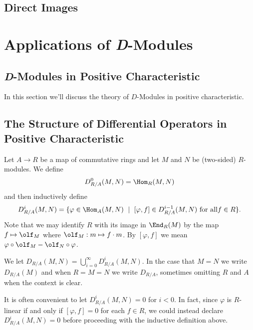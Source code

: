 
\subsection{Direct Images}

\section{Applications of \textit{D}-Modules}


\subsection{\emph{D}-Modules in Positive Characteristic}
In this section we'll discuss the theory of $D$-Modules in positive characteristic. 
\subsection{The Structure of Differential Operators in Positive Characteristic}

\begin{defn}\label{defn:diff-op-rings}
	Let $A\to R$ be a map of commutative rings and let $M$ and $N$ be (two-sided) $R$-modules. We define
	\begin{align*}
		D^0_{R/A}(M,N) = \Hom_R(M,N)
	\end{align*}
	and then inductively define
	\begin{align*}
		D^i_{R/A}(M,N) = \{\varphi \in \Hom_A(M,N) ~\mid~ [\varphi,f] \in D^{i-1}_{R/A}(M,N) ~ \text{for all} f \in R\}.
	\end{align*}
    Note that we may identify $R$ with its image in $\End_R(M)$ by the map $f \mapsto \olf_M$ where $\olf_M: m\mapsto f\cdot m$. By $[\varphi,f]$ we mean $\varphi\circ \olf_M - \olf_N\circ \varphi$.

	We let $D_{R/A}(M,N) = \bigcup_{i=0}^\infty D^{i}_{R/A}(M,N)$. In the case that $M = N$ we write $D_{R/A}(M)$ and when $R = M = N$ we write $D_{R/A}$, sometimes omitting $R$ and $A$ when the context is clear.
\end{defn}
It is often convenient to let $D^i_{R/A}(M,N) = 0$ for $i < 0$. In fact, since $\varphi$ is $R$-linear if and only if $[\varphi, f] = 0$ for each $f \in R$, we could instead declare $D^i_{R/A}(M,N) = 0$ before proceeding with the inductive definition above.

